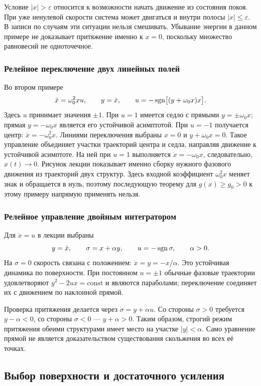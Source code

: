 \addition Условие $|x|>\varepsilon$ относится к возможности начать движение
из состояния покоя. При уже ненулевой скорости система может двигаться и
внутри полосы $|x|\le\varepsilon$. В записи по случаям эти ситуации нельзя
смешивать. Убывание энергии в данном примере не доказывает притяжение
именно к $x=0$, поскольку множество равновесий не одноточечное.

\subsubsection{Релейное переключение двух линейных полей}

Во втором примере
\[
 \ddot x=\omega_0^2xu,\qquad y=\dot x,\qquad
 u=-\operatorname{sgn}\bigl[(y+\omega_0x)x\bigr].
\]
Здесь $u$ принимает значения $\pm1$. При $u=1$ имеется седло с прямыми
$y=\pm\omega_0x$; прямая $y=-\omega_0x$ является его устойчивой асимптотой.
При $u=-1$ получается центр: $\ddot x=-\omega_0^2x$.
Линиями переключения выбраны $x=0$ и $y+\omega_0x=0$.
Такое управление объединяет участки траекторий центра и седла, направляя
движение к устойчивой асимптоте. На ней при $u=1$ выполняется
$\dot x=-\omega_0x$, следовательно, $x(t)\to0$.
Рисунок лекции показывает именно сборку нужного фазового движения из
траекторий двух структур. Здесь входной коэффициент $\omega_0^2x$ меняет
знак и обращается в нуль, поэтому последующую теорему для $g(x)\ge g_0>0$
к этому примеру напрямую применять нельзя.

\subsubsection{Релейное управление двойным интегратором}

Для $\ddot x=u$ в лекции выбраны
\[
 y=\dot x,\qquad \sigma=x+\alpha y,\qquad
 u=-\operatorname{sgn}\sigma,\qquad \alpha>0.
\]
На $\sigma=0$ скорость связана с положением: $\dot x=y=-x/\alpha$.
Это устойчивая динамика по поверхности. При постоянном $u=\pm1$ обычные
фазовые траектории удовлетворяют $y^2-2ux=\text{const}$ и являются параболами;
переключение соединяет их с движением по наклонной прямой.

\addition Проверка притяжения делается через
$\dot\sigma=y+\alpha u$. Со стороны $\sigma>0$ требуется
$y-\alpha<0$, со стороны $\sigma<0$ --- $y+\alpha>0$.
Таким образом, строгий режим притяжения обеими структурами имеет место
на участке $|y|<\alpha$. Само уравнение прямой не является доказательством
существования скольжения во всех её точках.

\subsection{Выбор поверхности и достаточного усиления}

